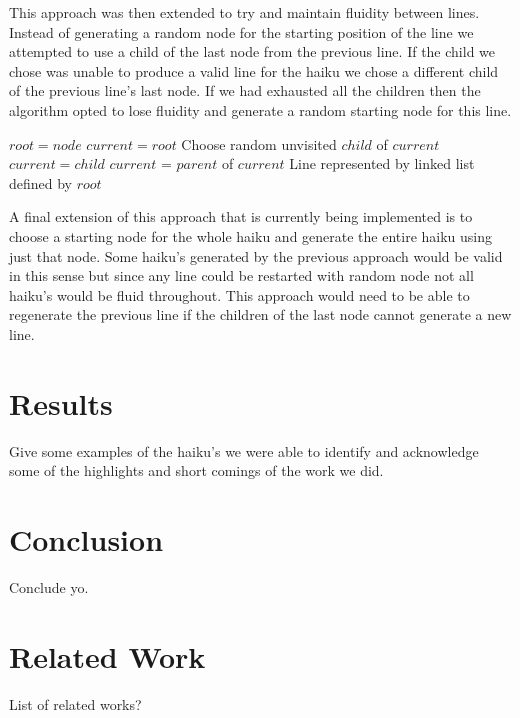 \documentclass[]{article}
\begin{document}
This approach was then extended to try and maintain fluidity between lines. Instead of generating a random node for the starting position of the line we attempted to use a child of the last node from the previous line. If the child we chose was unable to produce a valid line for the haiku we chose a different child of the previous line's last node. If we had exhausted all the children then the algorithm opted to lose fluidity and generate a random starting node for this line.

\begin{algorithm}[H]
	\caption{$Depth\_First\_Search(node, n)$} \label{DFSB_WithStart}
	\begin{algorithmic}[1]
		\State $root = node$
		\State $current = root$
		\State Choose random unvisited $child$ of $current$
		\State $current = child$
		\EndIf
		\Else
		\Else
		\State $current$ = $parent$ of $current$
		\EndIf
		\EndIf
		\EndWhile
		\Return Line represented by linked list defined by $root$
	\end{algorithmic}
\end{algorithm}

A final extension of this approach that is currently being implemented is to choose a starting node for the whole haiku and generate the entire haiku using just that node. Some haiku's generated by the previous approach would be valid in this sense but since any line could be restarted with random node not all haiku's would be fluid throughout. This approach would need to be able to regenerate the previous line if the children of the last node cannot generate a new line.


\section{Results}
Give some examples of the haiku's we were able to identify and acknowledge some of the highlights and short comings of the work we did.

\section{Conclusion}
Conclude yo.

\section{Related Work}
List of related works?



\end{document}
